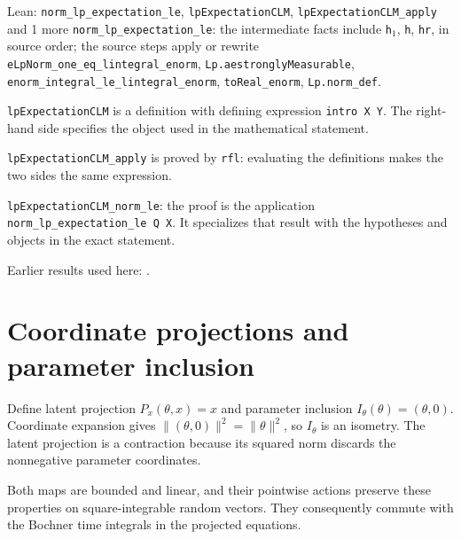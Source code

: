 \documentclass[11pt,a4paper]{article}
\begin{document}
\begin{leanbox}{Lean: \texttt{norm\_\allowbreak{}lp\_\allowbreak{}expectation\_\allowbreak{}le}, \texttt{lpExpectationCLM}, \texttt{lpExpectationCLM\_\allowbreak{}apply} and 1 more}
\texttt{norm\_\allowbreak{}lp\_\allowbreak{}expectation\_\allowbreak{}le}: the intermediate facts include \texttt{h\ensuremath{{}_{1}}}, \texttt{h}, \texttt{hr}, in source order; the source steps apply or rewrite \texttt{e\allowbreak{}Lp\allowbreak{}Norm\_\allowbreak{}one\_\allowbreak{}eq\_\allowbreak{}lintegral\_\allowbreak{}enorm}, \texttt{Lp.\allowbreak{}aestrongly\allowbreak{}Measurable}, \texttt{enorm\_\allowbreak{}integral\_\allowbreak{}le\_\allowbreak{}lintegral\_\allowbreak{}enorm}, \texttt{to\allowbreak{}Real\_\allowbreak{}enorm}, \texttt{Lp.\allowbreak{}norm\_\allowbreak{}def}.



\texttt{lp\allowbreak{}Expectation\allowbreak{}CLM} is a definition with defining expression \texttt{intro X Y}. The right-hand side specifies the object used in the mathematical statement.



\texttt{lp\allowbreak{}Expectation\allowbreak{}CLM\_\allowbreak{}apply} is proved by \texttt{rfl}: evaluating the definitions makes the two sides the same expression.



\texttt{lp\allowbreak{}Expectation\allowbreak{}CLM\_\allowbreak{}norm\_\allowbreak{}le}: the proof is the application \texttt{norm\_\allowbreak{}lp\_\allowbreak{}expectation\_\allowbreak{}le Q X}. It specializes that result with the hypotheses and objects in the exact statement.
\end{leanbox}


Earlier results used here: \cite[Section~3.11.1]{LangevinLean2026IPLA}.

\section{\texorpdfstring{Coordinate projections and parameter inclusion}{Coordinate projections and parameter inclusion}}


Define latent projection \(P_x(\theta,x)=x\) and parameter inclusion \(I_\theta(\theta)=(\theta,0)\). Coordinate expansion gives \(\|(\theta,0)\|^2=\|\theta\|^2\), so \(I_\theta\) is an isometry. The latent projection is a contraction because its squared norm discards the nonnegative parameter coordinates.



Both maps are bounded and linear, and their pointwise actions preserve these properties on square-integrable random vectors. They consequently commute with the Bochner time integrals in the projected equations.
\end{document}
